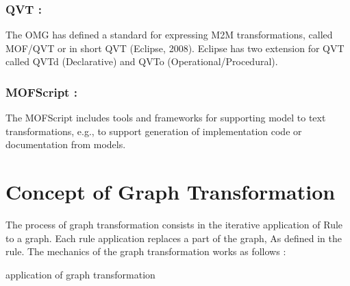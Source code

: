 \subsubsection{QVT :} 
The OMG has defined a standard for expressing M2M transformations, called MOF/QVT or in short QVT (Eclipse, 2008). Eclipse has two extension for QVT called QVTd (Declarative) and QVTo (Operational/Procedural)\cite{ch3lang}.

\subsubsection{MOFScript :} 
The MOFScript includes tools and frameworks for supporting model to text transformations, e.g., to support generation of implementation code or documentation from models\cite{ch3lang}.




\section{Concept of Graph Transformation} 
The process of graph transformation consists in the iterative application of
Rule to a graph. Each rule application replaces a part of the graph, As defined in the rule. 
The mechanics of the graph transformation works as follows : 

\begin{algorithm}
\SetAlgoLined


  
 \caption{application of graph transformation}
\end{algorithm}

